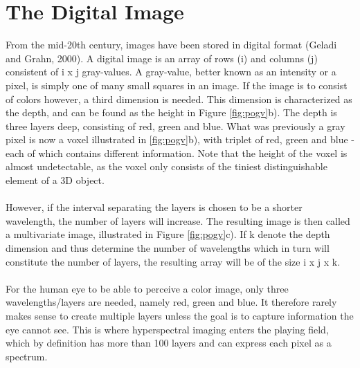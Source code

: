 \section{The Digital Image}
From the mid-20th century, images have been stored in digital format (Geladi and Grahn, 2000). A digital image is an array of rows (i) and columns (j) consistent of i x j gray-values. A gray-value, better known as an intensity or a pixel, is simply one of many small squares in an image. If the image is to consist of colors however, a third dimension is needed. This dimension is characterized as the depth, and can be found as the height in Figure \ref{fig:pogv}b). The depth is three layers deep, consisting of red, green and blue. What was previously a gray pixel is now a voxel illustrated in \ref{fig:pogv}b), with triplet of red, green and blue - each of which contains different information. Note that the height of the voxel is almost undetectable, as the voxel only consists of the tiniest distinguishable element of a 3D object.
\\\\
However, if the interval separating the layers is chosen to be a shorter wavelength, the number of layers will increase. The resulting image is then called a multivariate image, illustrated in Figure \ref{fig:pogv}c). If k denote the depth dimension and thus determine the number of wavelengths which in turn will constitute the number of layers, the resulting array will be of the size i x j x k.
\\\\
For the human eye to be able to perceive a color image, only three wavelengths/layers are needed, namely red, green and blue. It therefore rarely makes sense to create multiple layers unless the goal is to capture information the eye cannot see. This is where hyperspectral imaging enters the playing field, which by definition has more than 100 layers and can express each pixel as a spectrum.

